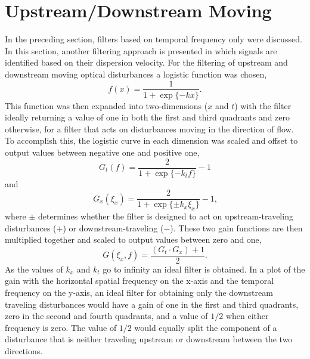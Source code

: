 \section{Upstream/Downstream Moving}
In the preceding section, filters based on temporal frequency only were discussed. In this section, another filtering approach is presented in which signals are identified based on their dispersion velocity.
For the filtering of upstream and downstream moving optical disturbances a logistic function was chosen,
\begin{equation}
 f(x) = \frac{1}{1+\exp\{-kx\}} \textrm{.}
 \label{eqn:06_logistic}
\end{equation}
This function was then expanded into two-dimensions ($x$ and $t$) with the filter ideally returning a value of one in both the first and third quadrants and zero otherwise, for a filter that acts on disturbances moving in the direction of flow.
To accomplish this, the logistic curve in each dimension was scaled and offset to output values between negative one and positive one,
\begin{equation}
 G_t(f) = \frac{2}{1+\exp\{-k_tf\}}-1
 \label{eqn:06_logistic_time}
\end{equation}
and
\begin{equation}
 G_x(\xi_x) = \frac{2}{1+\exp\{\pm k_x\xi_x\}}-1 \textrm{,}
 \label{eqn:06_logistic_space}
\end{equation}
where $\pm$ determines whether the filter is designed to act on upstream-traveling disturbances ($+$) or downstream-traveling ($-$).
These two gain functions are then multiplied together and scaled to output values between zero and one,
\begin{equation}
 G(\xi_x,f) = \frac{(G_t\cdot G_x)+1}{2} \textrm{.}
 \label{eqn:06_up_down_filter}
\end{equation}
As the values of $k_x$ and $k_t$ go to infinity an ideal filter is obtained.
In a plot of the gain with the horizontal spatial frequency on the x-axis and the temporal frequency on the y-axis, an ideal filter for obtaining only the downstream traveling disturbances would have a gain of one in the first and third quadrants, zero in the second and fourth quadrants, and a value of $1/2$ when either frequency is zero.
The value of $1/2$ would equally split the component of a disturbance that is neither traveling upstream or downstream between the two directions.

